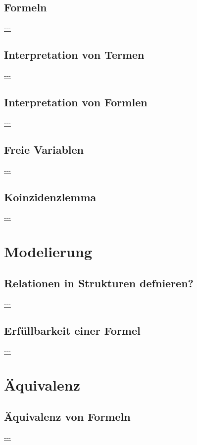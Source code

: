 \documentclass[twocolumn]{article}
\begin{document}
    \subsection{Formeln}
    \url{---}\\

    \subsection{Interpretation von Termen}
    \url{---}\\

    \subsection{Interpretation von Formlen}
    \url{---}\\

    \subsection{Freie Variablen}
    \url{---}\\

    \subsection{Koinzidenzlemma}
    \url{---}\\

    \section{Modelierung}

    \subsection{Relationen in Strukturen defnieren?}
    \url{---}\\

    \subsection{Erfüllbarkeit einer Formel}
    \url{---}\\

    \section{Äquivalenz}

    \subsection{Äquivalenz von Formeln}
    \url{---}\\
\end{document}
